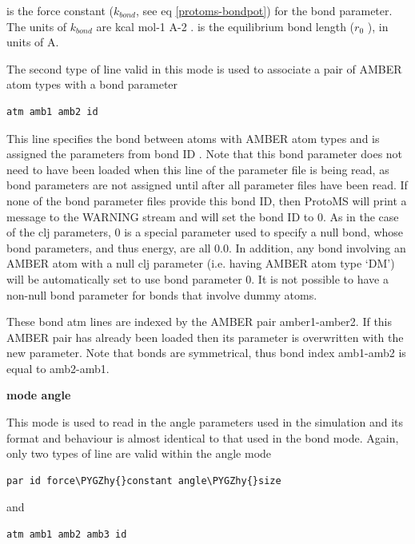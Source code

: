 \documentclass[letterpaper,10pt,english]{sphinxmanual}
\def\PYGZhy{\char`\-}
\begin{document}
 is the force constant (\(k_{bond}\), see eq \eqref{protoms-bondpot}) for the bond parameter. The units of \(k_{bond}\) are kcal mol-1 A-2 .  is the equilibrium bond length (\(r_0\) ), in units of A.

The second type of line valid in this mode is used to associate a pair of AMBER atom types with a bond parameter

\begin{Verbatim}[frame=single,commandchars=\\\{\}]
atm amb1 amb2 id
\end{Verbatim}

This line specifies the bond between atoms with AMBER atom types  and  is assigned the parameters from bond ID . Note that this bond parameter does not need to have been loaded when this line of the parameter file is being read, as bond parameters are not assigned until after all parameter files have been read. If none of the bond parameter files provide this bond ID, then ProtoMS will print a message to the WARNING stream and will set the bond ID to 0. As in the case of the clj parameters, 0 is a special parameter used to specify a null bond, whose bond parameters, and thus energy, are all 0.0. In addition, any bond involving an AMBER atom with a null clj parameter (i.e. having AMBER atom type ‘DM’) will be automatically set to use bond parameter 0. It is not possible to have a non-null bond parameter for bonds that involve dummy atoms.

These bond atm lines are indexed by the AMBER pair amber1-amber2. If this AMBER pair has already been loaded then its parameter is overwritten with the new parameter. Note that bonds are symmetrical, thus bond index amb1-amb2 is equal to amb2-amb1.

\textbf{mode angle}

This mode is used to read in the angle parameters used in the simulation and its format and behaviour is almost identical to that used in the bond mode. Again, only two types of line are valid within the angle mode

\begin{Verbatim}[frame=single,commandchars=\\\{\}]
par id force\PYGZhy{}constant angle\PYGZhy{}size
\end{Verbatim}

and

\begin{Verbatim}[frame=single,commandchars=\\\{\}]
atm amb1 amb2 amb3 id
\end{Verbatim}
\end{document}
